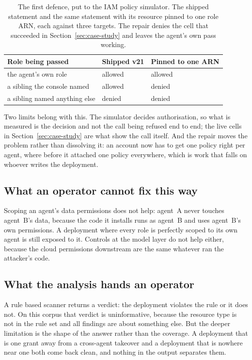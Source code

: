 \begin{table}[t]
\centering
\caption{The first defence, put to the IAM policy simulator. The shipped
statement and the same statement with its resource pinned to one role ARN,
each against three targets. The repair denies the cell that succeeded in
Section~\ref{sec:case-study} and leaves the agent's own pass working.}
\label{tab:repair}
\small
\begin{tabular}{@{}llL{22mm}@{}}
\toprule
\textbf{Role being passed} & \textbf{Shipped v21} & \textbf{Pinned to one ARN} \\
\midrule
the agent's own role & allowed & allowed \\
a sibling the console named & allowed & denied \\
a sibling named anything else & denied & denied \\
\bottomrule
\end{tabular}
\end{table}

Two limits belong with this. The simulator decides authorisation, so what is
measured is the decision and not the  call being
refused end to end; the live cells in Section~\ref{sec:case-study} are what
show the call itself. And the repair moves the problem rather than dissolving
it: an account now has to get one policy right per agent, where before it
attached one policy everywhere, which is work that falls on whoever writes the
deployment.

\subsection{What an operator cannot fix this way}

Scoping an agent's data permissions does not help: agent~A never touches
agent~B's data, because the code it installs runs as agent~B and uses
agent~B's own permissions. A deployment where every role is perfectly scoped to its own agent is still
exposed to it. Controls at the model
layer do not help either, because the cloud permissions downstream are the
same whatever ran the attacker's code.

\subsection{What the analysis hands an operator}

A rule based scanner returns a verdict: the deployment violates the rule or it
does not. On this corpus that verdict is uninformative, because the resource
type is not in the rule set and all \nCheckovFailed findings are about
something else. But the deeper limitation is the shape of the answer rather
than the coverage. A deployment that is one grant away from a cross-agent
takeover and a deployment that is nowhere near one both come back clean, and
nothing in the output separates them.

